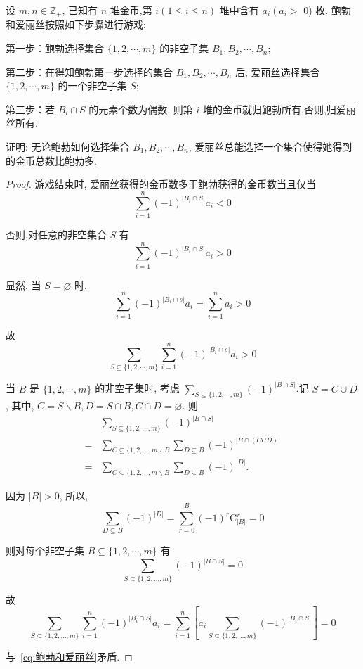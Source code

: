 \begin{example}
	设 $m, n \in \mathbb{Z}_{+}$, 已知有 $n$ 堆金币,第 $i(1 \leqslant i \leqslant n)$ 堆中含有 $a_{i}\left(a_{i}>\right.$ 0) 枚. 鲍勃和爱丽丝按照如下步骤进行游戏:

		第一步：鲍勃选择集合 $\{1,2, \cdots, m\}$ 的非空子集 $B_{1}, B_{2}, \cdots, B_{n}$;

		第二步：在得知鲍勃第一步选择的集合 $B_{1}, B_{2}, \cdots, B_{n}$ 后, 爱丽丝选择集合 $\{1,2, \cdots, m\}$ 的一个非空子集 $S ;$

		第三步：若 $B_{i} \cap S$ 的元素个数为偶数, 则第 $i$ 堆的金币就归鲍勃所有,否则,归爱丽丝所有.

		证明: 无论鲍勃如何选择集合 $B_{1}, B_{2}, \cdots, B_{n}$, 爱丽丝总能选择一个集合使得她得到的金币总数比鲍勃多.
\end{example}

\begin{proof}
	游戏结束时, 爱丽丝获得的金币数多于鲍勃获得的金币数当且仅当
	$$
		\sum_{i=1}^{n}(-1)^{\left|B_{i} \cap S\right|} a_{i}<0
	$$

	否则,对任意的非空集合 $S$ 有
	$$
		\sum_{i=1}^{n}(-1)^{\left|B_{i} \cap S\right|} a_{i}>0
	$$

	显然, 当 $S=\varnothing$ 时,
	$$
		\sum_{i=1}^{n}(-1)^{\left|B_{i} \cap s\right|} a_{i}=\sum_{i=1}^{n} a_{i}>0
	$$

	故
	\begin{equation}
		\sum_{S \subseteq\{1,2, \cdots, m\}} \sum_{i=1}^{n}(-1)^{\left|B_{i} \cap s\right|} a_{i}>0 
		\label{eq:鲍勃和爱丽丝}
	\end{equation}

	当 $B$ 是 $\{1,2, \cdots, m\}$ 的非空子集时, 考虑 $\sum_{S \subseteq\{1,2, \cdots, m\}}(-1)^{|B \cap S|}$.记 $S=C \cup D$, 其中, $C=S \backslash B, D=S \cap B, C \cap D=\varnothing$. 则
	$$
		\begin{aligned}
			  & \sum_{S \subseteq\{1,2, \ldots, m\}}(-1)^{|B \cap S|}                                 \\
			= & \sum_{C \subseteq\{1,2, \ldots, m \nmid B} \sum_{D \subseteq B}(-1)^{|B \cap(C U D)|} \\
			= & \sum_{C \subseteq\{1,2, \cdots, m \backslash B} \sum_{D \subseteq B}(-1)^{|D|} .
		\end{aligned}
	$$

	因为 $|B|>0$, 所以,
	$$
		\sum_{D \subseteq B}(-1)^{|D|}=\sum_{r=0}^{|B|}(-1)^{r} \mathrm{C}_{|B|}^{r}=0
	$$

	则对每个非空子集 $B \subseteq\{1,2, \cdots, m\}$ 有
	$$
		\sum_{S \subseteq\{1,2, \ldots, m\}}(-1)^{|B \cap S|}=0
	$$

	故
	$$
		\sum_{S \subseteq\{1,2, \ldots, m\}} \sum_{i=1}^{n}(-1)^{\left|B_{i} \cap S\right|} a_{i}=\sum_{i=1}^{n}\left[a_{i} \sum_{S \subseteq\{1,2, \ldots, m\}}(-1)^{\left|B_{i} \cap S\right|}\right]=0
	$$

	与~\autoref{eq:鲍勃和爱丽丝}矛盾.
\end{proof}

